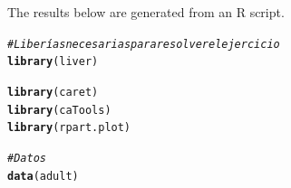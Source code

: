 \documentclass{article}\usepackage[]{graphicx}\usepackage[]{xcolor}
\makeatletter
\newcommand{\hlcom}[1]{\textcolor[rgb]{0.678,0.584,0.686}{\textit{#1}}}%
\newcommand{\hlstd}[1]{\textcolor[rgb]{0.345,0.345,0.345}{#1}}%
\newcommand{\hlkwd}[1]{\textcolor[rgb]{0.737,0.353,0.396}{\textbf{#1}}}%
\newenvironment{kframe}{%
 \def\at@end@of@kframe{}%
 \ifinner\ifhmode%
  \def\at@end@of@kframe{\end{minipage}}%
  \begin{minipage}{\columnwidth}%
 \fi\fi%
 \def\FrameCommand##1{\hskip\@totalleftmargin \hskip-\fboxsep
 \colorbox{shadecolor}{##1}\hskip-\fboxsep
     \hskip-\linewidth \hskip-\@totalleftmargin \hskip\columnwidth}%
 \MakeFramed {\advance\hsize-\width
   \@totalleftmargin\z@ \linewidth\hsize
   \@setminipage}}%
 {\par\unskip\endMakeFramed%
 \at@end@of@kframe}
\newenvironment{knitrout}{}{} %
\makeatother
\begin{document}
\title{\title{\title{\title{\title{\title{\title{\title{}}}}}}}}



\maketitle
The results below are generated from an R script.

\begin{knitrout}
\color{fgcolor}\begin{kframe}
\begin{alltt}
\hlcom{# Liberías necesarias para resolver el ejercicio}
\hlkwd{library}\hlstd{(liver)}
\end{alltt}


{\ttfamily\noindent\itshape\color{messagecolor}{\#\# \\\#\# Attaching package: 'liver'}}

{\ttfamily\noindent\itshape\color{messagecolor}{\#\# The following object is masked from 'package:base':\\\#\# \\\#\# \ \ \ \ transform}}\begin{alltt}
\hlkwd{library}\hlstd{(caret)}
\hlkwd{library}\hlstd{(caTools)}
\hlkwd{library}\hlstd{(rpart.plot)}

\hlcom{# Datos}
\hlkwd{data}\hlstd{(adult)}


\end{alltt}
\end{kframe}
\end{knitrout}
\end{document}
